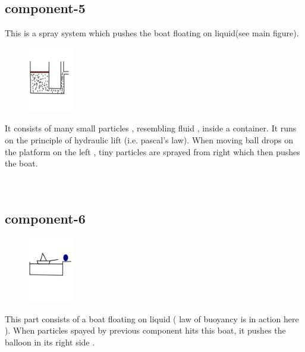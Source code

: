 \documentclass{article}
\begin{document}
\newpage


\subsection{component-5}
This is a spray system which pushes the boat floating on liquid(see main figure).\\ 
\begin{figure}
    \centering
    \vspace{-20pt}
    \includegraphics[width=0.18\textwidth]{p5}
    \vspace{-20pt}
\end{figure}
It consists of many small particles , resembling fluid , inside a container.
It runs on the principle of hydraulic lift (i.e. pascal's law)\cite{eq1}. When moving ball drops on the platform on the left , tiny particles are sprayed from right which then pushes the boat.
\\
\\
\\

\subsection{component-6}
\begin{figure}
    \centering
    \vspace{-20pt}
    \includegraphics[width=0.18\textwidth]{p6}
    \vspace{-20pt}
\end{figure}
This part consists of a boat floating on liquid ( law of buoyancy is in action here ). When particles spayed by previous component hits this boat,
it pushes the balloon in its right side .
\\
\\
\\
\end{document}

